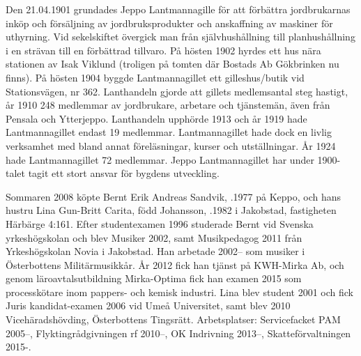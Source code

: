 Den 21.04.1901 grundades Jeppo Lantmannagille för att förbättra jordbrukarnas inköp och försäljning av jordbruksprodukter och anskaffning av maskiner för uthyrning. Vid sekelskiftet övergick man från självhushållning till planhushållning i en strävan till en förbättrad tillvaro. På hösten 1902 hyrdes ett hus nära stationen av Isak Viklund	(troligen på tomten där Bostads Ab Gökbrinken nu finns). På hösten 1904 byggde Lantmannagillet ett gilleshus/butik vid Stationsvägen, 	nr 362. Lanthandeln gjorde att gillets medlemsantal steg hastigt, år 1910	248 medlemmar av jordbrukare, arbetare och tjänstemän, även från 	Pensala och Ytterjeppo. Lanthandeln upphörde 1913 och år 1919 hade 	Lantmannagillet endast 19 medlemmar. Lantmannagillet hade dock en livlig verksamhet med bland annat föreläsningar, kurser och 	utställningar. År 1924 hade Lantmannagillet 72 medlemmar. Jeppo	Lantmannagillet har under 1900-talet tagit ett stort ansvar för bygdens utveckling.






Sommaren 2008 köpte Bernt Erik Andreas Sandvik, .1977 på Keppo, och hans hustru Lina Gun-Britt Carita, född Johansson, .1982 i Jakobstad, fastigheten Härbärge 4:161. Efter studentexamen 1996 studerade Bernt vid Svenska yrkeshögskolan och blev Musiker 2002, samt Musikpedagog 2011 från Yrkeshögskolan Novia 	i Jakobstad. Han arbetade 2002-- som musiker i Österbottens Militärmusikkår. År 2012 fick han tjänst på KWH-Mirka Ab, och genom 	läroavtalsutbildning Mirka-Optima fick han examen 2015 som processkötare inom pappers- och kemisk industri. Lina blev student 2001 och fick Juris kandidat-examen 2006 vid Umeå Universitet, samt	blev 2010 Vicehäradshövding, Österbottens Tingsrätt. Arbetsplatser: Servicefacket PAM 2005--, Flyktingrådgivningen rf 2010--, OK Indrivning 2013--, Skatteförvaltningen 2015-.
\begin{jhchildren}
  \item {}
  \item {}
  \item {}
  \item {}
\end{jhchildren}


